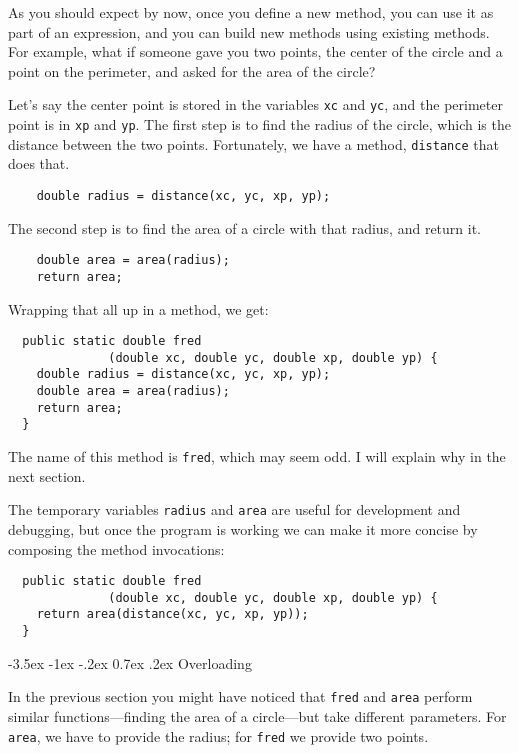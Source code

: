 \documentclass{book}
\makeatletter
\renewcommand{\section}{\@startsection 
    {section} {1} {0mm}%
    {-3.5ex \@plus -1ex \@minus -.2ex}%
    {0.7ex \@plus.2ex}%
    {\normalfont\Large\bfseries}}
\makeatother
\begin{document}
As you should expect by now, once you define a new method,
you can use it as part of an expression, and you can build
new methods using existing methods.  For example, what if someone
gave you two points, the center of the circle and a point on
the perimeter, and asked for the area of the circle?

Let's say the center point is stored in the variables {\tt xc}
and {\tt yc}, and the perimeter point is in {\tt xp} and
{\tt yp}.  The first step is to find the radius of the circle, which
is the distance between the two points.  Fortunately, we have
a method, {\tt distance} that does that.

\begin{verbatim}
    double radius = distance(xc, yc, xp, yp);
\end{verbatim}
%
The second step is to find the area of a circle with that
radius, and return it.

\begin{verbatim}
    double area = area(radius);
    return area;
\end{verbatim}
%
Wrapping that all up in a method, we get:

\begin{verbatim}
  public static double fred
              (double xc, double yc, double xp, double yp) {
    double radius = distance(xc, yc, xp, yp);
    double area = area(radius);
    return area;
  } 
\end{verbatim}
%
The name of this method is {\tt fred}, which may seem odd.  I will
explain why in the next section.

The temporary variables {\tt radius} and {\tt area} are
useful for development and debugging, but once the program is
working we can make it more concise by composing
the method invocations:

\begin{verbatim}
  public static double fred
              (double xc, double yc, double xp, double yp) {
    return area(distance(xc, yc, xp, yp));
  } 
\end{verbatim}

\section{Overloading}
\label{overloading}

In the previous section you might have noticed that {\tt fred}
and {\tt area} perform similar functions---finding
the area of a circle---but take different parameters.  For
{\tt area}, we have to provide the radius; for {\tt fred}
we provide two points.
\end{document}
